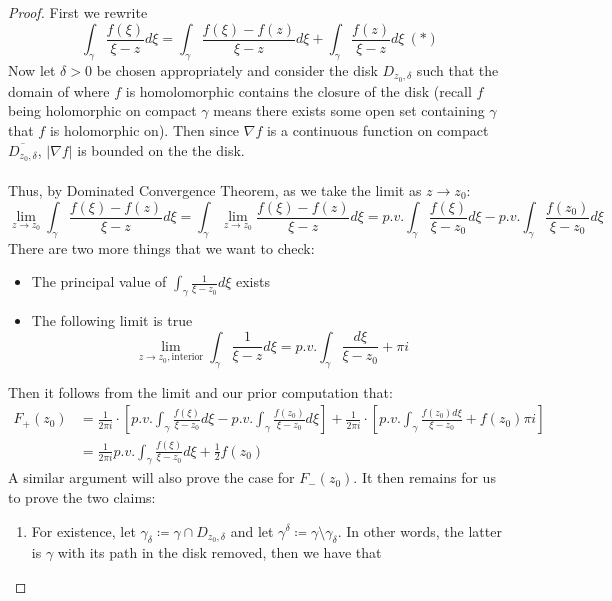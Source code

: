 \begin{proof}
    First we rewrite
    \[\int_\gamma \frac{f(\xi)}{\xi - z} d\xi = \int_\gamma \frac{f(\xi) - f(z)}{\xi - z} d\xi + \int_\gamma \frac{f(z)}{\xi - z} d\xi\ (*)\]
    Now let $\delta > 0$ be chosen appropriately and consider the disk $D_{z_0, \delta}$ such that the domain of where $f$ is homolomorphic contains the closure of the disk (recall $f$ being holomorphic on compact $\gamma$ means there exists some open set containing $\gamma$ that $f$ is holomorphic on). Then since $\nabla f$ is a continuous function on compact $\overline{D_{z_0, \delta}}$, $|\nabla f|$ is bounded on the the disk.\\\\
    Thus, by Dominated Convergence Theorem, as we take the limit as $z \to z_0$:
    \[\lim_{z \to z_0} \int_\gamma \frac{f(\xi) - f(z)}{\xi - z} d\xi = \int_\gamma \lim_{z \to z_0} \frac{f(\xi) - f(z)}{\xi - z} d\xi = p.v. \int_\gamma \frac{f(\xi)}{\xi - z_0} d\xi - p.v. \int_\gamma \frac{f(z_0)}{\xi - z_0} d\xi\]
    There are two more things that we want to check:
    \begin{itemize}
        \item The principal value of $\int_\gamma \frac{1}{\xi - z_0} d\xi$ exists
        \item The following limit is true \[\lim_{z \to z_0, \text{interior}} \int_\gamma \frac{1}{\xi - z} d\xi = p.v. \int_\gamma \frac{d\xi}{\xi - z_0} + \pi i\]
    \end{itemize}
    Then it follows from the limit and our prior computation that:
    \begin{align*}
        F_+(z_0) &= \frac{1}{2\pi i} \cdot [p.v. \int_\gamma \frac{f(\xi)}{\xi - z_0} d\xi  - p.v. \int_\gamma \frac{f(z_0)}{\xi - z_0} d\xi] + \frac{1}{2\pi i} \cdot [p.v. \int_\gamma \frac{f(z_0) d\xi}{\xi - z_0} + f(z_0) \pi i]\\
        &= \frac{1}{2\pi i} p.v. \int_\gamma \frac{f(\xi)}{\xi - z_0} d\xi + \frac{1}{2} f(z_0) \tag*{We can cancel the principal values because they exist}
    \end{align*}
    A similar argument will also prove the case for $F_{-}(z_0)$. It then remains for us to prove the two claims:
    \begin{enumerate}
        \item For existence, let $\gamma_\delta \coloneqq \gamma \cap D_{z_0, \delta}$ and let $\gamma^\delta \coloneqq \gamma \setminus \gamma_\delta$. In other words, the latter is $\gamma$ with its path in the disk removed, then we have that

\end{enumerate}
\end{proof}
